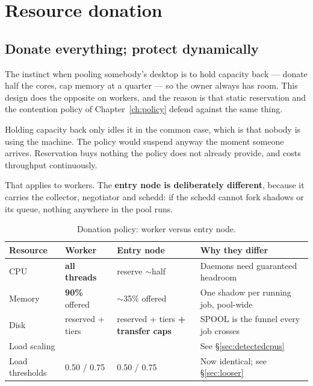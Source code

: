 \chapter{Resource donation}
\label{ch:donation}

\section{Donate everything; protect dynamically}

The instinct when pooling somebody's desktop is to hold capacity back --- donate
half the cores, cap memory at a quarter --- so the owner always has room. This
design does the opposite on workers, and the reason is that static reservation
and the contention policy of Chapter~\ref{ch:policy} defend against the same
thing.

\begin{keypoint}
Holding capacity back only idles it in the common case, which is that nobody is
using the machine. The policy would suspend anyway the moment someone arrives.
Reservation buys nothing the policy does not already provide, and costs
throughput continuously.
\end{keypoint}

That applies to workers. The \textbf{entry node is deliberately different},
because it carries the collector, negotiator and schedd: if the schedd cannot
fork shadows or  its queue, nothing anywhere in the pool runs.

\begin{table}[H]
\centering
\begin{tabularx}{\textwidth}{L{0.16\textwidth} L{0.19\textwidth} L{0.19\textwidth} Y}
\toprule
\textbf{Resource} & \textbf{Worker} & \textbf{Entry node} & \textbf{Why they differ} \\
\midrule
CPU & \textbf{all threads} & reserve $\sim$half & Daemons need guaranteed headroom \\
Memory & \textbf{90\%} offered & $\sim$35\% offered & One shadow per running job, pool-wide \\
Disk & reserved + tiers & reserved + tiers \textbf{+ transfer caps} & SPOOL is the funnel every job crosses \\
Load scaling &  & \textbf{} & See \S\ref{sec:detectedcpus} \\
Load thresholds & 0.50 / 0.75 & 0.50 / 0.75 & Now identical; see \S\ref{sec:looser} \\
\bottomrule
\end{tabularx}
\caption{Donation policy: worker versus entry node.}
\end{table}

